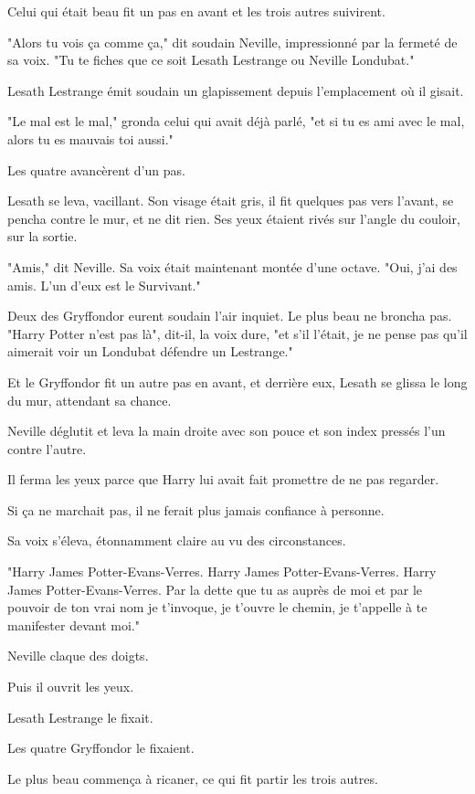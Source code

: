 Celui qui était beau fit un pas en avant et les trois autres suivirent.

"Alors tu vois ça comme ça," dit soudain Neville, impressionné par la fermeté de sa voix. "Tu te fiches que ce soit Lesath Lestrange ou Neville Londubat."

Lesath Lestrange émit soudain un glapissement depuis l'emplacement où il gisait.

"Le mal est le mal," gronda celui qui avait déjà parlé, "et si tu es ami avec le mal, alors tu es mauvais toi aussi."

Les quatre avancèrent d'un pas.

Lesath se leva, vacillant. Son visage était gris, il fit quelques pas vers l'avant, se pencha contre le mur, et ne dit rien. Ses yeux étaient rivés sur l'angle du couloir, sur la sortie.

"Amis," dit Neville. Sa voix était maintenant montée d'une octave. "Oui, j'ai des amis. L'un d'eux est le Survivant."

Deux des Gryffondor eurent soudain l'air inquiet. Le plus beau ne broncha pas. "Harry Potter n'est pas là", dit-il, la voix dure, "et s'il l'était, je ne pense pas qu'il aimerait voir un Londubat défendre un Lestrange."

Et le Gryffondor fit un autre pas en avant, et derrière eux, Lesath se glissa le long du mur, attendant sa chance.

Neville déglutit et leva la main droite avec son pouce et son index pressés l'un contre l'autre.

Il ferma les yeux parce que Harry lui avait fait promettre de ne pas regarder.

Si ça ne marchait pas, il ne ferait plus jamais confiance à personne.

Sa voix s'éleva, étonnamment claire au vu des circonstances.

"Harry James Potter-Evans-Verres. Harry James Potter-Evans-Verres. Harry James Potter-Evans-Verres. Par la dette que tu as auprès de moi et par le pouvoir de ton vrai nom je t'invoque, je t'ouvre le chemin, je t'appelle à te manifester devant moi."

Neville claque des doigts.

Puis il ouvrit les yeux.

Lesath Lestrange le fixait.

Les quatre Gryffondor le fixaient.

Le plus beau commença à ricaner, ce qui fit partir les trois autres.

